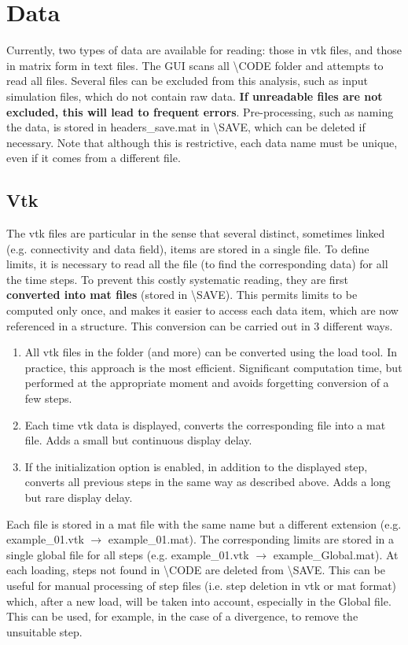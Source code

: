 \documentclass{article}
\begin{document}
\section{Data}

Currently, two types of data are available for reading: those in vtk files, and those in matrix form in text files. The GUI scans all \textbackslash CODE folder and attempts to read all files. Several files can be excluded from this analysis, such as input simulation files, which do not contain raw data. \textbf{If unreadable files are not excluded, this will lead to frequent errors}. Pre-processing, such as naming the data, is stored in headers\_save.mat in \textbackslash SAVE, which can be deleted if necessary. Note that although this is restrictive, each data name must be unique, even if it comes from a different file.

\subsection{Vtk}

The vtk files are particular in the sense that several distinct, sometimes linked (e.g. connectivity and data field), items are stored in a single file. To define limits, it is necessary to read all the file (to find the corresponding data) for all the time steps. To prevent this costly systematic reading, they are first \textbf{converted into mat files} (stored in \textbackslash SAVE). This permits limits to be computed only once, and makes it easier to access each data item, which are now referenced in a structure. This conversion can be carried out in 3 different ways.

\begin{enumerate}
    \item All vtk files in the folder (and more) can be converted using the load tool. In practice, this approach is the most efficient. Significant computation time, but performed at the appropriate moment and avoids forgetting conversion of a few steps.
    \item Each time vtk data is displayed, converts the corresponding file into a mat file. Adds a small but continuous display delay.
    \item If the initialization option is enabled, in addition to the displayed step, converts all previous steps in the same way as described above. Adds a long but rare display delay.
\end{enumerate}

Each file is stored in a mat file with the same name but a different extension (e.g. example\_01.vtk $\rightarrow$ example\_01.mat). The corresponding limits are stored in a single global file for all steps (e.g. example\_01.vtk $\rightarrow$ example\_Global.mat). At each loading, steps not found in \textbackslash CODE are deleted from \textbackslash SAVE. This can be useful for manual processing of step files (i.e. step deletion in vtk or mat format) which, after a new load, will be taken into account, especially in the Global file. This can be used, for example, in the case of a divergence, to remove the unsuitable step.
\end{document}
